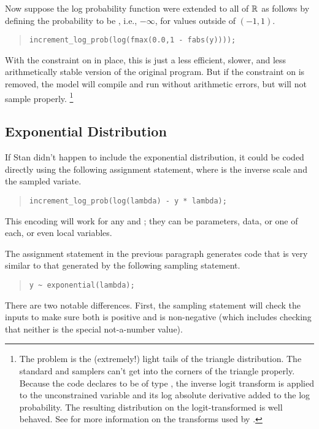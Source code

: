 Now suppose the log probability function were extended to all of
$\mathbb{R}$ as follows by defining the probability to be ,
i.e., $-\infty$, for values outside of $(-1,1)$.
%
\begin{quote}
\begin{Verbatim}[fontsize=\small]
increment_log_prob(log(fmax(0.0,1 - fabs(y))));
\end{Verbatim}
\end{quote}
%
With the constraint on  in place, this is just a less
efficient, slower, and less arithmetically stable version of the
original program.  But if the constraint on  is removed, 
the model will compile and run without arithmetic errors, but will not
sample properly.%
%
\footnote{The problem is the (extremely!) light tails of the triangle
  distribution.  The standard \HMC and \NUTS samplers can't get into the
  corners of the triangle properly.  Because the \Stan code declares
   to be of type , the inverse logit
  transform is applied to the unconstrained variable and its log
  absolute derivative added to the log probability.  The resulting
  distribution on the logit-transformed  is well behaved.  See
   for more information on the
  transforms used by \Stan.}

\subsection{Exponential Distribution}

If Stan didn't happen to include the exponential distribution, it
could be coded directly using the following assignment statement,
where  is the inverse scale and  the sampled
variate.
%
\begin{quote}
\begin{Verbatim}[fontsize=\small]
increment_log_prob(log(lambda) - y * lambda);
\end{Verbatim}
\end{quote}
%
This encoding will work for any  and ; they can
be parameters, data, or one of each, or even local variables.

The assignment statement in the previous paragraph generates 
\Cpp code that is very similar to that generated by the following
sampling statement.
%
\begin{quote}
\begin{Verbatim}[fontsize=\small]
y ~ exponential(lambda);
\end{Verbatim}
\end{quote}
%
There are two notable differences.  First, the sampling statement will
check the inputs to make sure both  is positive and
 is non-negative (which includes checking that neither is the
special not-a-number value).

